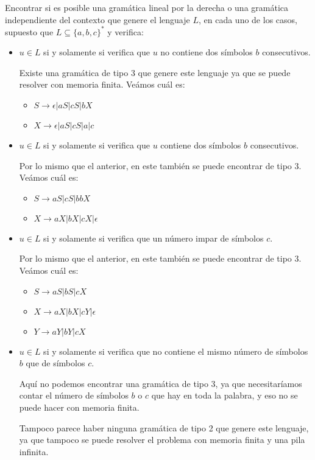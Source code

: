 \documentclass[a4paper, 11pt]{article}
\begin{document}
Encontrar si es posible una gramática lineal por la derecha o una gramática independiente del contexto que genere el lenguaje $L$, en cada uno de los casos, supuesto que $L\subseteq\{a,b,c\}^*$ y verifica:

\begin{itemize}
\item $u\in L$ si y solamente si verifica que $u$ no contiene dos símbolos $b$ consecutivos.

Existe una gramática de tipo 3 que genere este lenguaje ya que se puede resolver con memoria finita. Veámos cuál es:
\begin{itemize}
\item $S \longrightarrow \epsilon | aS | cS | bX$
\item $X \longrightarrow \epsilon | aS | cS | a | c$
\end{itemize}
\item $u\in L$ si y solamente si verifica que $u$ contiene dos símbolos $b$ consecutivos.

Por lo mismo que el anterior, en este también se puede encontrar de tipo 3. Veámos cuál es:
\begin{itemize}
\item $S \longrightarrow aS | cS | bbX$
\item $X \longrightarrow aX | bX | cX | \epsilon$
\end{itemize}
\item $u\in L$ si y solamente si verifica que un número impar de símbolos $c$.

Por lo mismo que el anterior, en este también se puede encontrar de tipo 3. Veámos cuál es:
\begin{itemize}
\item $S \longrightarrow aS | bS | cX$
\item $X \longrightarrow aX | bX | cY | \epsilon$
\item $Y \longrightarrow aY | bY | cX$
\end{itemize}
\item $u\in L$ si y solamente si verifica que no contiene el mismo número de símbolos $b$ que de símbolos $c$.

Aquí no podemos encontrar una gramática de tipo 3, ya que necesitaríamos contar el número de símbolos $b$ o $c$ que hay en toda la palabra, y eso no se puede hacer con memoria finita.

Tampoco parece haber ninguna gramática de tipo 2 que genere este lenguaje, ya que tampoco se puede resolver el problema con memoria finita y una pila infinita.
\end{itemize}
\end{document}
